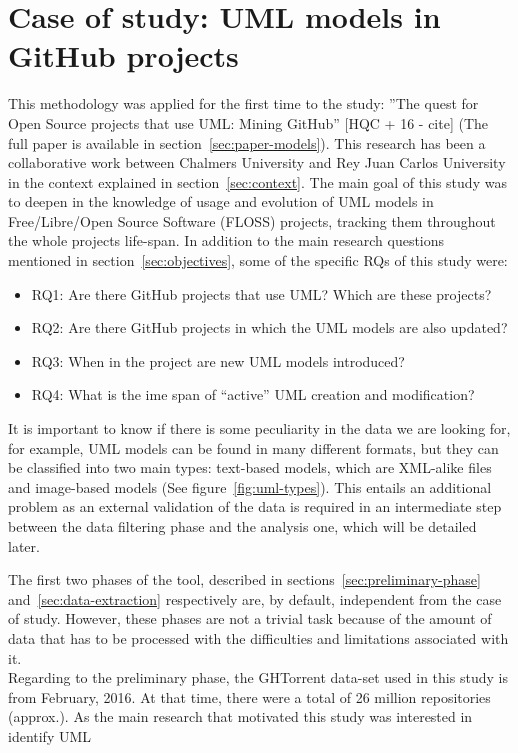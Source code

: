 \documentclass[a4paper, 12pt]{book}
\begin{document}
\section{Case of study: UML models in GitHub projects}
\label{sec:case-study-uml}
This methodology was applied for the first time to the study: ”The quest for Open Source projects that use
UML: Mining GitHub” [HQC + 16 - cite] (The full paper is available in section~\ref{sec:paper-models}).
This research has been a collaborative work between Chalmers University and Rey Juan Carlos University in the context
explained in section~\ref{sec:context}.
The main goal of this study was to deepen in the knowledge of usage and evolution of UML models in
Free/Libre/Open Source Software (FLOSS) projects, tracking them throughout the whole projects life-span.
In addition to the main research questions mentioned in section~\ref{sec:objectives}, some of the specific RQs
of this study were:
\begin{itemize}
  \item RQ1: Are there GitHub projects that use UML? Which are these projects?
  \item RQ2: Are there GitHub projects in which the UML models are also updated?
  \item RQ3: When in the project are new UML models introduced?
  \item RQ4: What is the ime span of ``active'' UML creation and modification?
\end{itemize}
It is important to know if there is some peculiarity in the data we are looking for, for example, UML models can be
found in many different formats, but they can be classified into two main types: text-based models, which are XML-alike
files and image-based models (See figure~\ref{fig:uml-types}). This entails an additional problem as an external validation of the data is
required in an intermediate step between the data filtering phase and the analysis one, which will be detailed later.\par
The first two phases of the tool, described in sections~\ref{sec:preliminary-phase} and~\ref{sec:data-extraction} respectively
are, by default, independent from the case of study. However, these phases are not a trivial task because of the amount of
data that has to be processed with the difficulties and limitations associated with it.\\
Regarding to the preliminary phase, the GHTorrent data-set used in this study is from February, 2016. At that time, there were
a total of 26 million repositories (approx.). As the main research that motivated this study was interested in identify UML
\end{document}
